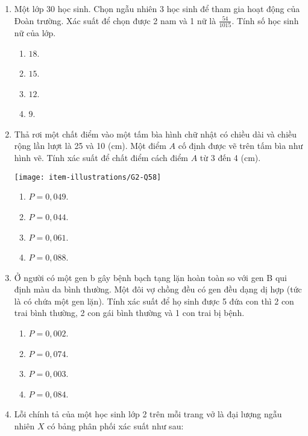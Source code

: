 \begin{enumerate}[label=\textbf{Câu \arabic*.},align=left,left=0cm..0cm,itemindent=*]
\begin{multicols}{4}
\begin{enumerate}[label=\textbf{\Alph*.},align=left,left=1cm..0cm,itemindent=*]
	\end{enumerate}\end{multicols}
	\item Một lớp 30 học sinh. Chọn ngẫu nhiên 3 học sinh để tham gia hoạt động của Đoàn trường. Xác suất để chọn được 2 nam và 1 nữ là $\frac{54}{1015}$. Tính số học sinh nữ của lớp.
	\begin{multicols}{4}\begin{enumerate}[label=\textbf{\Alph*.},align=left,left=1cm..0cm,itemindent=*]
		\item $18$. \item $15$. \item $12$. \item $9$.
	\end{enumerate}\end{multicols}
	\item Thả rơi một chất điểm vào một tấm bìa hình chữ nhật có chiều dài và chiều rộng lần lượt là 25 và 10 (cm). Một điểm $A$ cố định được vẽ trên tấm bìa như hình vẽ. Tính xác suất để chất điểm cách điểm $A$ từ 3 đến 4 (cm).\par
	{\centering\texttt{[image: item-illustrations/G2-Q58]}\par}
	\begin{enumerate}[label=\textbf{\Alph*.},align=left,left=1cm..0cm,itemindent=*]
		\item $P=0,049$. \item $P=0,044$. \item $P=0,061$. \item $P=0,088$.
	\end{enumerate}
	\item Ở người có một gen b gây bệnh bạch tạng lặn hoàn toàn so với gen B qui định màu da bình thường. Một đôi vợ chồng đều có gen đều dạng dị hợp (tức là có chứa một gen lặn). Tính xác suất để họ sinh được 5 đứa con thì 2 con trai bình thường, 2 con gái bình thường và 1 con trai bị bệnh.
	\begin{enumerate}[label=\textbf{\Alph*.},align=left,left=1cm..0cm,itemindent=*]
		\item $P=0,002$. \item $P=0,074$. \item $P=0,003$. \item $P=0,084$.
	\end{enumerate}
	\item Lỗi chính tả của một học sinh lớp 2 trên mỗi trang vở là đại lượng ngẫu nhiên $X$ có bảng phân phối xác suất như sau:
	\begin{longtable}{|c|c|c|c|c|c|c|}\hline

\end{longtable}
\end{enumerate}
